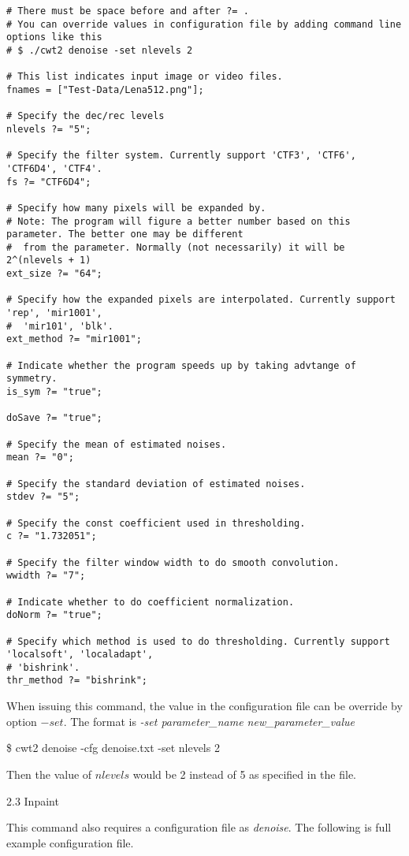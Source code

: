 \documentclass[a4paper,5pt]{article}
\begin{document}
\begin{lstlisting}
# There must be space before and after ?= .
# You can override values in configuration file by adding command line options like this
# $ ./cwt2 denoise -set nlevels 2

# This list indicates input image or video files.
fnames = ["Test-Data/Lena512.png"];

# Specify the dec/rec levels
nlevels ?= "5";

# Specify the filter system. Currently support 'CTF3', 'CTF6', 'CTF6D4', 'CTF4'.
fs ?= "CTF6D4";

# Specify how many pixels will be expanded by.
# Note: The program will figure a better number based on this parameter. The better one may be different
#  from the parameter. Normally (not necessarily) it will be 2^(nlevels + 1)
ext_size ?= "64";

# Specify how the expanded pixels are interpolated. Currently support 'rep', 'mir1001',
#  'mir101', 'blk'.
ext_method ?= "mir1001";

# Indicate whether the program speeds up by taking advtange of symmetry.
is_sym ?= "true";

doSave ?= "true";

# Specify the mean of estimated noises.
mean ?= "0";

# Specify the standard deviation of estimated noises.
stdev ?= "5";

# Specify the const coefficient used in thresholding.
c ?= "1.732051";

# Specify the filter window width to do smooth convolution.
wwidth ?= "7";

# Indicate whether to do coefficient normalization.
doNorm ?= "true";

# Specify which method is used to do thresholding. Currently support 'localsoft', 'localadapt',
# 'bishrink'.
thr_method ?= "bishrink";
\end{lstlisting}

  When issuing this command, the value in the configuration file can be override by option $-set$. The format is \textit{-set parameter\_name  new\_parameter\_value}
  
  \$ cwt2 denoise -cfg denoise.txt -set nlevels 2
  
  Then the value of $nlevels$ would be 2 instead of 5 as specified in the file.
  
2.3 Inpaint

  This command also requires a configuration file as \textit{denoise}. The following is full example configuration file.
  
\end{document}
